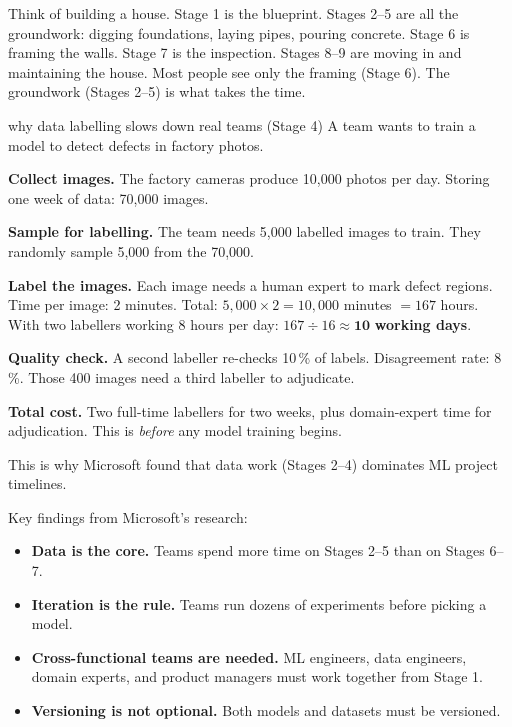 \documentclass[a4paper,11pt]{article}
\begin{document}
\begin{everyday}
Think of building a house.
Stage 1 is the blueprint.
Stages 2--5 are all the groundwork: digging foundations, laying pipes, pouring concrete.
Stage 6 is framing the walls.
Stage 7 is the inspection.
Stages 8--9 are moving in and maintaining the house.
Most people see only the framing (Stage 6). The groundwork (Stages 2--5) is what takes the time.
\end{everyday}

\begin{worked}{why data labelling slows down real teams (Stage 4)}
A team wants to train a model to detect defects in factory photos.
\begin{steps}
  \item \textbf{Collect images.} The factory cameras produce 10{,}000 photos per day.
        Storing one week of data: 70{,}000 images.
  \item \textbf{Sample for labelling.} The team needs 5{,}000 labelled images to train.
        They randomly sample 5{,}000 from the 70{,}000.
  \item \textbf{Label the images.} Each image needs a human expert to mark defect regions.
        Time per image: 2 minutes. Total: $5{,}000 \times 2 = 10{,}000$ minutes $= 167$ hours.
        With two labellers working 8 hours per day: $167 \div 16 \approx \mathbf{10}$ \textbf{working days}.
  \item \textbf{Quality check.} A second labeller re-checks 10\,\% of labels.
        Disagreement rate: 8\,\%. Those 400 images need a third labeller to adjudicate.
  \item \textbf{Total cost.} Two full-time labellers for two weeks, plus domain-expert time for adjudication.
        This is \emph{before} any model training begins.
\end{steps}
This is why Microsoft found that data work (Stages 2--4) dominates ML project timelines.
\end{worked}

\noindent Key findings from Microsoft's research:

\begin{itemize}
  \item \textbf{Data is the core.} Teams spend more time on Stages 2--5 than on Stages 6--7.
  \item \textbf{Iteration is the rule.} Teams run dozens of experiments before picking a model.
  \item \textbf{Cross-functional teams are needed.} ML engineers, data engineers, domain experts, and product managers must work together from Stage 1.
  \item \textbf{Versioning is not optional.} Both models and datasets must be versioned.
\end{itemize}
\end{document}
